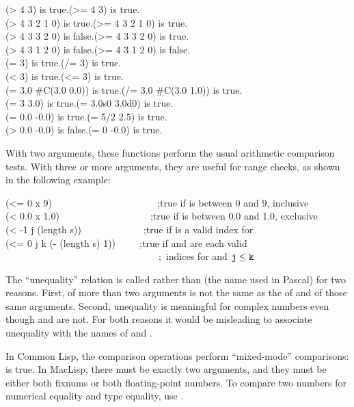 \begin{defun}[Function]
\begin{lisp}
(> 4 3) {\rm is true.}\>(>= 4 3) {\rm is true.} \\
(> 4 3 2 1 0) {\rm is true.}\>(>= 4 3 2 1 0) {\rm is true.} \\
(> 4 3 3 2 0) {\rm is false.}\>(>= 4 3 3 2 0) {\rm is true.} \\
(> 4 3 1 2 0) {\rm is false.}\>(>= 4 3 1 2 0) {\rm is false.} \\
(= 3) {\rm is true.}\>(/= 3) {\rm is true.} \\
(< 3) {\rm is true.}\>(<= 3) {\rm is true.} \\
(= 3.0 \#C(3.0 0.0)) {\rm is true.}\>(/= 3.0 \#C(3.0 1.0)) {\rm is true.} \\
(= 3 3.0) {\rm is true.}\>(= 3.0s0 3.0d0) {\rm is true.} \\
(= 0.0 -0.0) {\rm is true.}\>(= 5/2 2.5) {\rm is true.} \\
(> 0.0 -0.0) {\rm is false.}\>(= 0 -0.0) {\rm is true.}
\end{lisp}
With two arguments, these functions perform the usual arithmetic
comparison tests.
With three or more arguments, they are useful for range checks,
as shown in the following example:
\begin{lisp}
(<= 0 x 9)~~~~~~~~~~~~~~~~~~~~~~;{\rm true if  is between 0 and 9, inclusive} \\
(< 0.0 x 1.0)~~~~~~~~~~~~~~~~~~~;{\rm true if  is between 0.0 and 1.0, exclusive} \\
(< -1 j (length s))~~~~~~~~~~~~~;{\rm true if  is a valid index for } \\
(<= 0 j k (- (length s) 1))~~~~~;{\rm true if  and  are each valid} \\
~~~~~~~~~~~~~~~~~~~~~~~~~~~~~~~~;~{\rm indices for  and $\hbox{\cd{j}}\leq\hbox{\cd{k}}$}
\end{lisp}

\beforenoterule
\begin{rationale}
The ``unequality'' relation is called \cd{/=} rather than
\cd{<>}
(the name used in Pascal) for two reasons.  First, \cd{/=} of more than two
arguments is not the same as the  of \cd{<} and \cd{>} of those same
arguments.  Second, unequality is meaningful for complex numbers even though
\cd{<} and \cd{>} are not.  For both reasons it would be misleading to
associate unequality with the names of \cd{<} and \cd{>}.
\end{rationale}
\betweennoterule
\begin{incompatibility}
In Common Lisp, the comparison operations
perform ``mixed-mode'' comparisons:  is true.  In MacLisp,
there must be exactly two arguments, and they must be either both fixnums
or both floating-point numbers.  To compare two numbers for numerical
equality and type equality, use .
\end{incompatibility}
\afternoterule
\end{defun}

